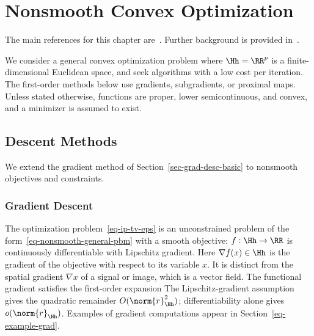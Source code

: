 
\chapter{Nonsmooth Convex Optimization}
\label{chap-conv-duality}


The main references for this chapter are~\cite{chambolle2010introduction,chambolle2016introduction,boyd2004convex}. Further background is provided in~\cite{parikh2014proximal,boyd2011distributed,beck2014introduction}.

We consider a general convex optimization problem
where $\Hh=\RR^p$ is a finite-dimensional Euclidean space,
and seek algorithms with a low cost per iteration. The first-order methods below use gradients, subgradients, or proximal maps. Unless stated otherwise, functions are proper, lower semicontinuous, and convex, and a minimizer is assumed to exist.


\section{Descent Methods}
\label{sec-grad-descent}

We extend the gradient method of Section~\ref{sec-grad-desc-basic} to nonsmooth objectives and constraints.

\subsection{Gradient Descent}

The optimization problem~\eqref{eq-ip-tv-eps} is an unconstrained problem of the form~\eqref{eq-nonsmooth-general-pbm} with a smooth objective: $f : \Hh \rightarrow \RR$ is continuously differentiable with Lipschitz gradient. Here $\nabla f(x)\in\Hh$ is the gradient of the objective with respect to its variable $x$. It is distinct from the spatial gradient $\nabla x$ of a signal or image, which is a vector field. The functional gradient satisfies the first-order expansion
The Lipschitz-gradient assumption gives the quadratic remainder $O(\norm{r}_{\Hh}^2)$; differentiability alone gives $o(\norm{r}_{\Hh})$. Examples of gradient computations appear in Section~\ref{eq-example-grad}.

